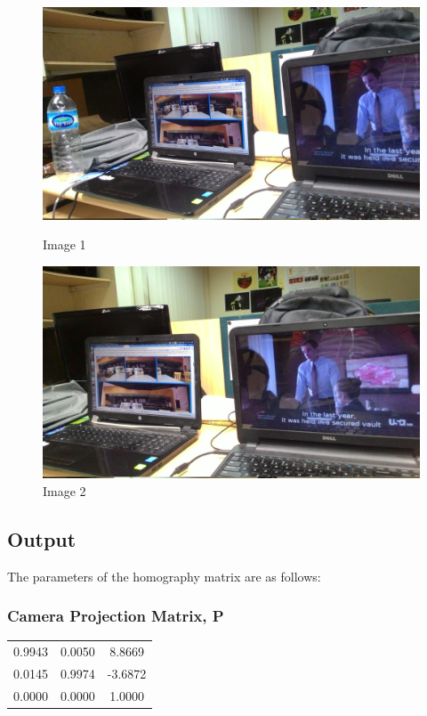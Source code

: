 \documentclass[12pt]{article}
\begin{document}
\begin{figure}[h]
\centering
\begin{minipage}{0.6\textwidth}
\centering
\includegraphics[scale = 0.067]{pt1.jpg}
\caption{Image 1}
\label{dltsiftInput1}
\end{minipage}%
\begin{minipage}{.5\textwidth}
\centering
\includegraphics[scale = 0.067]{pt2.jpg}
\caption{Image 2}
\label{dltsiftInput2}
\end{minipage}%
\end{figure}
\clearpage

\subsection{Output}

The parameters of the homography matrix are as follows:

\subsubsection{Camera Projection Matrix, P} 
\begin{tabular}{|c|c|c|}
\hline

 0.9943   &  0.0050 &  8.8669 \\ 
  0.0145  &  0.9974 &  -3.6872\\ 
  0.0000 &  0.0000 &  1.0000
\\ 
\hline
\end{tabular}
        
\end{document}
